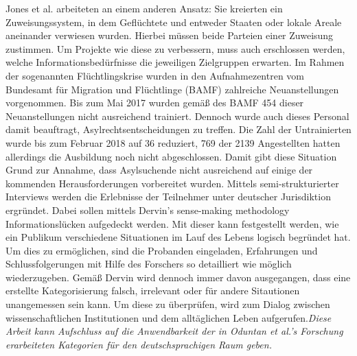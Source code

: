\documentclass[12pt,oneside]{article}
\begin{document}

Jones et al. arbeiteten an einem anderen Ansatz: Sie kreierten ein Zuweisungssystem, in dem Gefl\"uchtete und entweder Staaten oder lokale Areale aneinander verwiesen wurden. Hierbei m\"ussen beide Parteien einer Zuweisung zustimmen. \cite{jones2017matching}\newline
Um Projekte wie diese zu verbessern, muss auch erschlossen werden, welche Informationsbed\"urfnisse die jeweiligen Zielgruppen erwarten.\newline
Im Rahmen der sogenannten Fl\"uchtlingskrise wurden in den Aufnahmezentren vom {Bundesamt f\"ur Migration und Fl\"uchtlinge} (BAMF) zahlreiche Neuanstellungen vorgenommen. Bis zum Mai 2017 wurden gem\"a\ss{} des BAMF 454 dieser Neuanstellungen nicht ausreichend trainiert. Dennoch wurde auch dieses Personal damit beauftragt, Asylrechtsentscheidungen zu treffen.\newline
Die Zahl der Untrainierten wurde bis zum Februar 2018 auf 36 reduziert, 769 der 2139 Angestellten hatten allerdings die Ausbildung noch nicht abgeschlossen.\newline
Damit gibt diese Situation Grund zur Annahme, dass Asylsuchende nicht ausreichend auf einige der kommenden Herausforderungen vorbereitet wurden. \cite{asylum2018bamf}
Mittels semi-strukturierter Interviews werden die Erlebnisse der Teilnehmer unter deutscher Jurisdiktion ergr\"undet. Dabei sollen mittels Dervin's sense-making methodology Informationsl\"ucken aufgedeckt werden.\cite{dervin2003sense}\newline
Mit dieser kann festgestellt werden, wie ein Publikum verschiedene Situationen im Lauf des Lebens logisch begr\"undet hat. Um dies zu erm\"oglichen, sind die Probanden eingeladen, Erfahrungen und Schlussfolgerungen mit Hilfe des Forschers so detailliert wie m\"oglich wiederzugeben.\newline
Gem\"a\ss{} Dervin wird dennoch immer davon ausgegangen, dass eine erstellte Kategorisierung falsch, irrelevant oder f\"ur andere Sitautionen unangemessen sein kann. Um diese zu \"uberpr\"ufen, wird zum Dialog zwischen wissenschaftlichen Institutionen und dem allt\"aglichen Leben aufgerufen.\textit{Diese Arbeit kann Aufschluss auf die Anwendbarkeit der in Oduntan et al.'s Forschung erarbeiteten Kategorien f\"ur den deutschsprachigen Raum geben.}\newline
\end{document}
